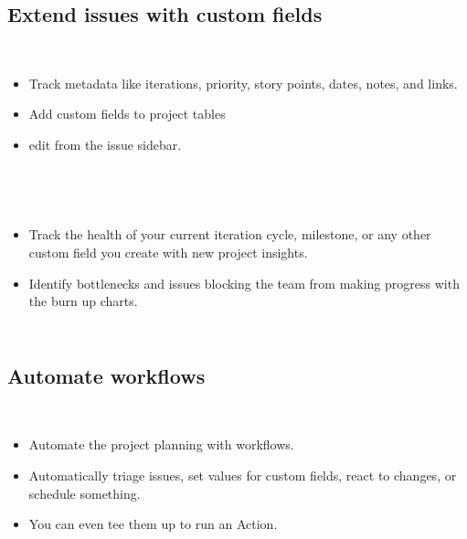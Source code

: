 \subsection{Extend issues with custom fields}

\begin{frame}
  \frametitle{\insertsectionhead}
  \framesubtitle{\insertsubsectionhead}
  \begin{columns}
    \begin{itemize}
      \item Track metadata like iterations, priority, story points, dates, notes, and links. 
      \item Add custom fields to project tables 
      \item edit from the issue sidebar.
    \end{itemize}
  \end{columns}
  

\end{frame}
\begin{frame}
  \frametitle{\insertsectionhead}
  \framesubtitle{\insertsubsectionhead}

  \begin{columns}
    \begin{itemize}
      \item Track the health of your current iteration cycle, milestone, or any other custom field you create with new project insights.
      \item  Identify bottlenecks and issues blocking the team from making progress with the burn up charts.
    \end{itemize}
  \end{columns}


\end{frame}
\subsection*{Automate workflows}
\begin{frame}
  \frametitle{\insertsectionhead}
  \framesubtitle{\insertsubsectionhead}
  \begin{columns}
    \begin{itemize}
      \item  Automate the project planning with workflows. 
      \item Automatically triage issues, set values for custom fields, react to changes, or schedule something. 
      \item You can even tee them up to run an Action.
    \end{itemize}
  \end{columns}

\end{frame}